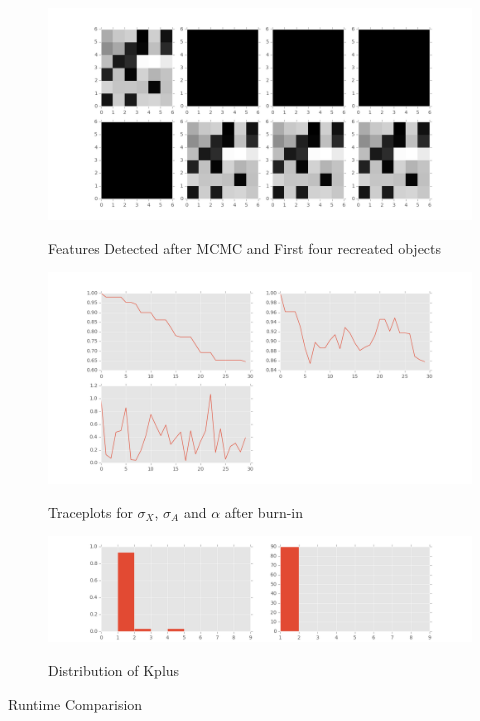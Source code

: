 \documentclass{article}
\begin{document}
\begin{figure}
\caption {Features Detected after MCMC and First four recreated objects}
\includegraphics[width=\linewidth]{figures/Detected.png}
\label{fig:detected}
\end{figure}

\begin{figure}
\caption {Traceplots for $\sigma_X$, $\sigma_A$ and $\alpha$ after burn-in}
\includegraphics[width=\linewidth]{figures/Trace.png}
\label{fig:trace}
\end{figure}

\begin{figure}
\caption {Distribution of Kplus}
\includegraphics[width=\linewidth]{figures/kDistribution.png}
\label{fig:dist}
\end{figure}

\begin{table}[ht]
\centering
\caption{Runtime Comparision \label{runtimes}}


\end{table}
\end{document}
